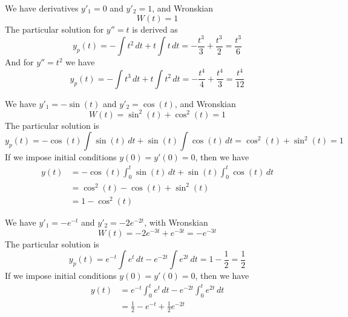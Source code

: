 \documentclass[a4paper]{article}
\begin{document}
\vspace{12pt}


We have derivatives \( y'_{1} = 0 \) and \( y'_{2} = 1 \), and Wronskian
\[
	W \!\left( t  \right) = 1 
\]
The particular solution for \( y'' = t  \) is derived as 
\[
	y_{p }\!\left( t  \right) = -\int t^{2} \, dt + t \int t \, dt = -\frac{t^{3}}{3} + \frac{t^{3}}{2} = \frac{t^{3}}{6}
\]
And for \( y'' = t^{2} \) we have
\[
	y_{p }\!\left( t  \right) = - \int t^{3} \, dt + t \int t^{2} \, dt = -\frac{t^{4}}{4}+ \frac{t^{4}}{3} = \frac{t^{4}}{12}
\]


We have \( y'_{1} = -\sin\!\left(t \right)  \) and \( y'_{2} = \cos\!\left(t \right)  \), and Wronskian
\[
	W \!\left( t  \right) = \sin^{2}\!\left(t\right) + \cos^{2}\!\left(t\right) = 1
\]
The particular solution is
\[
	y_{p }\!\left( t  \right) = -\cos\!\left(t \right) \int \sin\!\left(t \right) \, dt + \sin\!\left(t \right) \int \cos\!\left(t \right) \, dt = \cos^{2}\!\left(t\right) + \sin^{2}\!\left(t\right) = 1
\]
If we impose initial conditions \( y \!\left( 0 \right) = y'\!\left( 0 \right) = 0 \), then we have
\begin{align*}
	y \!\left( t  \right) & = -\cos\!\left(t \right) \int_{0}^{t } \sin\!\left(t \right)  \, dt + \sin\!\left(t \right) \int_{0}^{t } \cos\!\left(t \right)  \, dt \\
			      & = \cos^{2}\!\left(t\right) - \cos\!\left(t \right) + \sin^{2}\!\left(t\right) \\
			      & = 1 - \cos^{2}\!\left(t\right) 
\end{align*}


We have \( y'_{1} = -e^{-t } \) and \( y'_{2} = -2e^{-2t} \), with Wronskian
\[
	W \!\left( t  \right) = -2e^{-3t} + e^{-3t} = -e^{-3t} 
\]
The particular solution is
\[
	y_{p }\!\left( t  \right) = e^{-t } \int e^{t } \, dt - e^{-2t} \int e^{2t} \, dt = 1 - \frac{1}{2} = \frac{1}{2}
\]
If we impose initial conditions \( y \!\left( 0 \right) = y'\!\left( 0 \right) = 0 \), then we have
\begin{align*}
	y \!\left( t  \right) & = e^{-t } \int_{0}^{t } e^{t } \, dt - e^{-2t} \int_{0}^{t } e^{2t} \, dt   \\
	 & = \frac{1}{2} - e^{-t } + \frac{1}{2}e^{-2t} \\ 
\end{align*}
\end{document}
